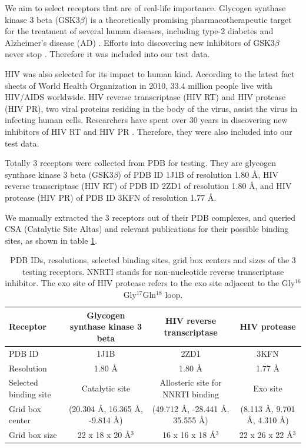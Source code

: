 \documentclass[10pt, conference, compsocconf]{IEEEtran}
\begin{document}
We aim to select receptors that are of real-life importance. Glycogen synthase kinase 3 beta (GSK3$\beta$) is a theoretically promising pharmacotherapeutic target for the treatment of several human diseases, including type-2 diabetes \cite{247} and Alzheimer's disease (AD) \cite{248}. Efforts into discovering new inhibitors of GSK3$\beta$ never stop \cite{246}. Therefore it was included into our test data.

HIV was also selected for its impact to human kind. According to the latest fact sheets of World Health Organization in 2010, 33.4 million people live with HIV/AIDS worldwide. HIV reverse transcriptase (HIV RT) and HIV protease (HIV PR), two viral proteins residing in the body of the virus, assist the virus in infecting human cells. Researchers have spent over 30 years in discovering new inhibitors of HIV RT and HIV PR \cite{221,222,223}. Therefore, they were also included into our test data.

Totally 3 receptors were collected from PDB \cite{96} for testing. They are glycogen synthase kinase 3 beta (GSK3$\beta$) of PDB ID 1J1B \cite{245} of resolution 1.80 \AA, HIV reverse transcriptase (HIV RT) of PDB ID 2ZD1 \cite{180} of resolution 1.80 \AA, and HIV protease (HIV PR) of PDB ID 3KFN \cite{243} of resolution 1.77 \AA.

We manually extracted the 3 receptors out of their PDB complexes, and queried CSA (Catalytic Site Altas) \cite{206} and relevant publications \cite{245,246,180,221,222,223,243} for their possible binding sites, as shown in table \ref{tab:searchspace}.

\begin{table}
\centering
\begin{tabular*}
{\linewidth}
{@{\extracolsep{\fill}}lccc}
\noalign{\smallskip}
\toprule
Receptor & Glycogen synthase kinase 3 beta & HIV reverse transcriptase & HIV protease\\
\midrule
\noalign{\smallskip}
PDB ID & 1J1B & 2ZD1 & 3KFN\\
Resolution & 1.80 \AA & 1.80 \AA & 1.77 \AA\\
Selected binding site & Catalytic site & Allosteric site for NNRTI binding & Exo site\\
Grid box center & (20.304 \AA, 16.365 \AA, -9.814 \AA) & (49.712 \AA, -28.441 \AA, 35.555 \AA) & (8.113 \AA, 9.701 \AA, 4.310 \AA) \\
Grid box size & 22 x 18 x 20 \AA$^3$ & 16 x 16 x 18 \AA$^3$ & 22 x 26 x 22 \AA$^3$\\
\bottomrule
\end{tabular*}
\caption{PDB IDs, resolutions, selected binding sites, grid box centers and sizes of the 3 testing receptors. NNRTI stands for non-nucleotide reverse transcriptase inhibitor. The exo site of HIV protease refers to the exo site adjacent to the Gly$^{16}$Gly$^{17}$Gln$^{18}$ loop.}
\label{tab:searchspace}
\end{table}
\end{document}
